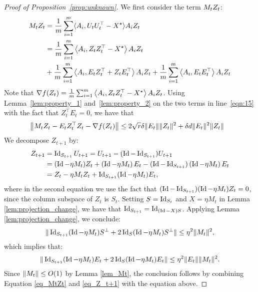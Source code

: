 \begin{proof}[Proof of Proposition~\ref{prop:unknown}]
	We first consider the term ${M}_t Z_t$:
	\begin{align}
		{M}_t {Z}_t &= \frac{1}{m}\sum_{i = 1}^m \langle {A}_i, {U}_t {U}_t^{\top} - {X}^\star \rangle {A}_i {Z}_t \nonumber
		\\
		& = \frac{1}{m}\sum_{i = 1}^m \left\langle {A}_i, Z_t Z_t^{\top} -{X}^\star\right\rangle   {A}_i {Z}_t 	\nonumber\\
		& + \frac{1}{m}  \sum_{i = 1}^m \left\langle {A}_i, {E}_t Z_t^{\top} + Z_t {E}_t^{\top}\right\rangle   {A}_iZ_t +  \frac{1}{m}\sum_{i = 1}^m \left\langle {A}_i,  {E}_t {E}_t^{\top}\right\rangle {A}_i {Z}_t  \label{eqn:15}
	\end{align}
	Note that $\nabla f(Z_t) =  \frac{1}{m}\sum_{i = 1}^m \left\langle {A}_i, Z_t Z_t^{\top} -{X}^\star\right\rangle   {A}_i {Z}_t$. 
	Using  Lemma~\ref{lem:property_1} and~\ref{lem:property_2} on the two terms in line~\eqref{eqn:15} with the fact that $Z_t^{\top} E_t = 0$, we have that
	\begin{align}
		&\left\|M_tZ_t - E_t Z_t^{\top} Z_t - \nabla f(Z_t)\right\|  \leq 
	2 \sqrt{r} \delta\| {E}_t\|\| Z_t\|^2 +  \delta d \| {E}_t \|^2 \|Z_t \|
		\label{eq_MtZt}
	\end{align}
We decompose $Z_{t+1}$ by: 
	\begin{align}
	Z_{t + 1} &= \operatorname{Id}_{S_{t + 1}} U_{t + 1} = U_{t + 1} - (\operatorname{Id} - \operatorname{Id}_{S_{t + 1}}) U_{t + 1} \nonumber
	\\
	& = (\operatorname{Id} - \eta M_{t }) Z_t + \left(\operatorname{Id} - \eta M_t \right) {E}_t  -  (\operatorname{Id} - \operatorname{Id}_{S_{t + 1}})  \left(\operatorname{Id} - \eta M_t \right) {E}_t  \nonumber
	\\
	&=  Z_t - \eta M_{t } Z_t  + \operatorname{Id}_{S_{t + 1}} ( \operatorname{Id} - \eta M_t ) E_t, \label{eq_Z_t+1}
	\end{align}
	where in the second equation we use the fact that
	$(\operatorname{Id} - \operatorname{Id}_{S_{t+1}}) (\operatorname{Id} - \eta M_t) Z_t = 0$,
	since the column subspace of $Z_t$ is $S_t$.
	Setting $S = \operatorname{Id}_{S_t}$ and $X = \eta M_t$ in Lemma \ref{lem:projection_change}, 
	we have that $\operatorname{Id}_{S_{t+1}} = \operatorname{Id}_{(\operatorname{Id} - X) S}$. Applying Lemma \ref{lem:projection_change}, we conclude:
	\begin{align*}
		\|\operatorname{Id}_{S_{t+1}} (\operatorname{Id} - \eta M_t) S^{\bot} + 2\operatorname{Id}_S (\operatorname{Id} - \eta M_t) S^{\bot}\| \le \eta^2 \|M_t\|^2,
	\end{align*}
	which implies that:
	\begin{align*}
		\|\operatorname{Id}_{S_{t+1}} (\operatorname{Id} - \eta M_t) E_t + 2\operatorname{Id}_S (\operatorname{Id} - \eta M_t) E_t\| \le \eta^2 \|E_t\| \|M_t\|^2.
	\end{align*}
	Since $\|M_t\| \le O(1)$ by Lemma \ref{lem_Mt},
	the conclusion follows by combining Equation \eqref{eq_MtZt} and \eqref{eq_Z_t+1} with the equation above.
\end{proof}

